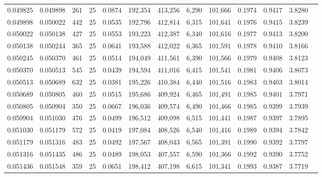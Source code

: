 \begin{tabular}{rrrrrrrrrrrrr}
0.049825 & 0.049898 &   261 &  25 &                                     0.0874 & 192,354 & 413,256 &   6,290 & 101,666 & 0.1974 & 0.9417 & 3.8280 \\
0.049898 & 0.050022 &   442 &  25 &                                     0.0535 & 192,796 & 412,814 &   6,315 & 101,641 & 0.1976 & 0.9415 & 3.8239 \\
0.050022 & 0.050138 &   427 &  25 &                                     0.0553 & 193,223 & 412,387 &   6,340 & 101,616 & 0.1977 & 0.9413 & 3.8200 \\
0.050138 & 0.050244 &   365 &  25 &                                     0.0641 & 193,588 & 412,022 &   6,365 & 101,591 & 0.1978 & 0.9410 & 3.8166 \\
0.050245 & 0.050370 &   461 &  25 &                                     0.0514 & 194,049 & 411,561 &   6,390 & 101,566 & 0.1979 & 0.9408 & 3.8123 \\
0.050370 & 0.050513 &   545 &  25 &                                     0.0439 & 194,594 & 411,016 &   6,415 & 101,541 & 0.1981 & 0.9406 & 3.8073 \\
0.050513 & 0.050689 &   632 &  25 &                                     0.0381 & 195,226 & 410,384 &   6,440 & 101,516 & 0.1983 & 0.9403 & 3.8014 \\
0.050689 & 0.050805 &   460 &  25 &                                     0.0515 & 195,686 & 409,924 &   6,465 & 101,491 & 0.1985 & 0.9401 & 3.7971 \\
0.050805 & 0.050904 &   350 &  25 &                                     0.0667 & 196,036 & 409,574 &   6,490 & 101,466 & 0.1985 & 0.9399 & 3.7939 \\
0.050904 & 0.051030 &   476 &  25 &                                     0.0499 & 196,512 & 409,098 &   6,515 & 101,441 & 0.1987 & 0.9397 & 3.7895 \\
0.051030 & 0.051179 &   572 &  25 &                                     0.0419 & 197,084 & 408,526 &   6,540 & 101,416 & 0.1989 & 0.9394 & 3.7842 \\
0.051179 & 0.051316 &   483 &  25 &                                     0.0492 & 197,567 & 408,043 &   6,565 & 101,391 & 0.1990 & 0.9392 & 3.7797 \\
0.051316 & 0.051435 &   486 &  25 &                                     0.0489 & 198,053 & 407,557 &   6,590 & 101,366 & 0.1992 & 0.9390 & 3.7752 \\
0.051436 & 0.051548 &   359 &  25 &                                     0.0651 & 198,412 & 407,198 &   6,615 & 101,341 & 0.1993 & 0.9387 & 3.7719 \\

\end{tabular}
